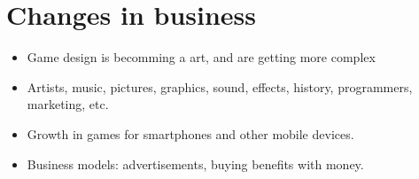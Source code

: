  \section*{Changes in business}
    \begin{itemize}
      \item Game design is becomming a art, and are getting more complex
      \item Artists, music, pictures, graphics, sound, effects, history, programmers, marketing, etc. 
      \item Growth in games for smartphones and other mobile devices. 
      \item Business models: advertisements, buying benefits with money.  
    \end{itemize}






